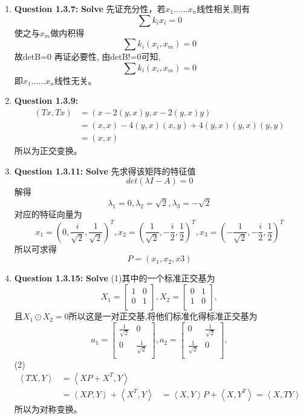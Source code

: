 \documentclass[UTF8]{uofa-eng-assignment}
\begin{document}
\begin{enumerate}
$$\begin{matrix}
            1&0&0\\
            0&2&0\\
            0&0&-1\\
        \end{matrix}\right]
$$
\item \textbf{Question 1.3.7:}
\textbf{Solve}
先证充分性，若$x_1......x_n$线性相关,则有
$$\sum{k_ix_i}=0$$
使之与$x_m$做内积得
$$\sum{k_i(x_i,x_m)}=0$$
故detB=0
再证必要性,
由detB!=0可知,
$$\sum{k_i(x_i,x_m)}=0$$
即$x_1......x_n$线性无关。
\item \textbf{Question 1.3.9:}
$$
\begin{aligned}
    (Tx,Tx)&=(x-2(y,x)y,x-2(y,x)y)\\
    &=(x,x)-4(y,x)(x,y)+4(y,x)(y,x)(y,y)\\
    &=(x,x)
\end{aligned}
$$
所以为正交变换。
\item \textbf{Question 1.3.11:}
\textbf{Solve}
先求得该矩阵的特征值
$$det(\lambda I-A)=0$$
解得$$\lambda_1=0,\lambda_2=\sqrt{2},\lambda_3=-\sqrt{2}$$
对应的特征向量为
$$
x_1=(0,\frac{i}{\sqrt{2}},\frac{1}{\sqrt{2}})^T,
x_2=(\frac{1}{\sqrt{2}},-\frac{i}{2},\frac{1}{2} )^T,
x_3=(-\frac{1}{\sqrt{2}},-\frac{i}{2},\frac{1}{2} )^T 
$$
所以可求得
$$P=(x_1,x_2,x3)$$
\item \textbf{Question 1.3.15:}
\textbf{Solve}
(1)其中的一个标准正交基为
$$
X_1=\left[
        \begin{matrix}
            1&0\\
            0&1\\
        \end{matrix}\right],
X_2=\left[
        \begin{matrix}
            0&1\\
            1&0\\
        \end{matrix}\right],
$$
且$X_1\odot X_2=0$所以这是一对正交基,将他们标准化得标准正交基为
$$
a_1=\left[
        \begin{matrix}
            \frac{1}{\sqrt{2}}&0\\
            0&\frac{1}{\sqrt{2}}\\
        \end{matrix}\right],
a_2=\left[
        \begin{matrix}
            0&\frac{1}{\sqrt{2}}\\
            \frac{1}{\sqrt{2}}&0\\
        \end{matrix}\right],
$$
(2)
$$
\begin{aligned}
    \left\langle TX,Y \right\rangle&=\left\langle XP+X^T,Y \right\rangle\\
    &=\left\langle XP,Y \right\rangle+\left\langle X^T,Y \right\rangle
    &=\left\langle X,Y \right\rangle P+\left\langle X,Y^T \right\rangle
    = \left\langle X,TY \right\rangle
\end{aligned}
$$
所以为对称变换。



\end{enumerate}
\end{document}

